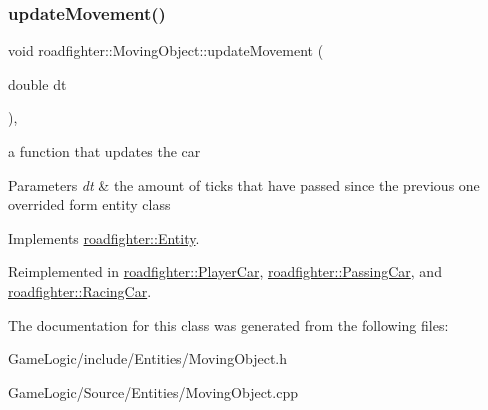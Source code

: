\mbox{\label{classroadfighter_1_1MovingObject_ac1918d96dac118c4bd7d99168d92867c}} 
\subsubsection{\texorpdfstring{update\+Movement()}{updateMovement()}}
{\footnotesize\ttfamily void roadfighter\+::\+Moving\+Object\+::update\+Movement (\begin{DoxyParamCaption}\item[{double}]{dt }\end{DoxyParamCaption})\hspace{0.3cm}{\ttfamily [override]}, {\ttfamily [virtual]}}

a function that updates the car 
\begin{DoxyParams}{Parameters}
{\em dt} & the amount of ticks that have passed since the previous one overrided form entity class \\
\hline
\end{DoxyParams}


Implements \hyperlink{classroadfighter_1_1Entity_a66614a11004d6f9516473f60b530f689}{roadfighter\+::\+Entity}.



Reimplemented in \hyperlink{classroadfighter_1_1PlayerCar_aa1dcbec01dde1b212e4919b61338edde}{roadfighter\+::\+Player\+Car}, \hyperlink{classroadfighter_1_1PassingCar_ade5ebca5d7dbdb75bd9eee5817972363}{roadfighter\+::\+Passing\+Car}, and \hyperlink{classroadfighter_1_1RacingCar_a2e8f3c63381a1fe432cddcc1f34fb935}{roadfighter\+::\+Racing\+Car}.



The documentation for this class was generated from the following files\+:\begin{DoxyCompactItemize}
\item 
Game\+Logic/include/\+Entities/Moving\+Object.\+h\item 
Game\+Logic/\+Source/\+Entities/Moving\+Object.\+cpp\end{DoxyCompactItemize}

